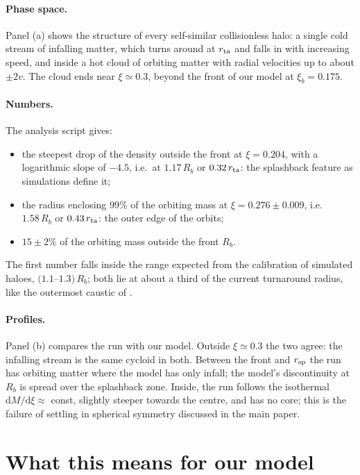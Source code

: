 \documentclass[11pt,a4paper]{article}
\newcommand{\dd}{\mathrm{d}}
\newcommand{\Rb}{R_b}
\newcommand{\rsp}{r_{\rm sp}}
\newcommand{\rta}{r_{\rm ta}}
\begin{document}
\paragraph{Phase space.} Panel (a) shows the structure of every
self-similar collisionless halo: a single cold stream of infalling
matter, which turns around at $\rta$ and falls in with increasing speed,
and inside a hot cloud of orbiting matter with radial velocities up to
about $\pm2v$. The cloud ends near $\xi\simeq0.3$, beyond the front of
our model at $\xi_b=0.175$.

\paragraph{Numbers.} The analysis script gives:
\begin{itemize}
\item the steepest drop of the density outside the front at
  $\xi=0.204$, with a logarithmic slope of $-4.5$, i.e.\ at
  $1.17\,\Rb$ or $0.32\,\rta$: the splashback feature as simulations
  define it;
\item the radius enclosing 99\% of the orbiting mass at
  $\xi=0.276\pm0.009$, i.e.\ $1.58\,\Rb$ or $0.43\,\rta$: the outer edge
  of the orbits;
\item $15\pm2\%$ of the orbiting mass outside the front $\Rb$.
\end{itemize}
The first number falls inside the range expected from the calibration of
simulated haloes, $(1.1$--$1.3)\,\Rb$; both lie at about a third of the
current turnaround radius, like the outermost caustic of
\citet{Bertschinger1985}.

\paragraph{Profiles.} Panel (b) compares the run with our model. Outside
$\xi\simeq0.3$ the two agree: the infalling stream is the same cycloid
in both. Between the front and $\rsp$ the run has orbiting matter where
the model has only infall; the model's discontinuity at $\Rb$ is spread
over the splashback zone. Inside, the run follows the isothermal
$\dd M/\dd\xi\approx$ const, slightly steeper towards the centre, and has
no core; this is the failure of settling in spherical symmetry discussed
in the main paper.

\section{What this means for our model}
\end{document}
